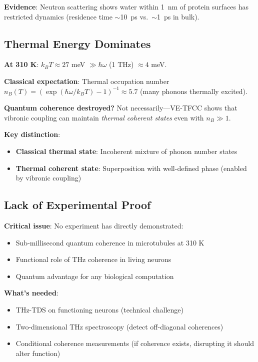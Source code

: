 \textbf{Evidence}: Neutron scattering shows water within 1~nm of protein surfaces has restricted dynamics (residence time $\sim$10~ps vs.~$\sim$1~ps in bulk).

\subsection{Thermal Energy Dominates}\label{thermal-energy-dominates}

\textbf{At 310 K}: $k_B T \approx 27$ meV $\gg \hbar \omega$ (1 THz) $\approx 4$ meV.

\textbf{Classical expectation}: Thermal occupation number $n_B(T) = (\exp(\hbar \omega / k_B T) - 1)^{-1} \approx 5.7$ (many phonons thermally excited).

\textbf{Quantum coherence destroyed?} Not necessarily---VE-TFCC shows that vibronic coupling can maintain \emph{thermal coherent states} even with $n_B \gg 1$.

\textbf{Key distinction}:
\begin{itemize}
\item \textbf{Classical thermal state}: Incoherent mixture of phonon number states
\item \textbf{Thermal coherent state}: Superposition with well-defined phase (enabled by vibronic coupling)
\end{itemize}

\subsection{Lack of Experimental Proof}\label{lack-of-experimental-proof}

\textbf{Critical issue}: No experiment has directly demonstrated:
\begin{itemize}
\item Sub-millisecond quantum coherence in microtubules at 310 K
\item Functional role of THz coherence in living neurons
\item Quantum advantage for any biological computation
\end{itemize}

\textbf{What's needed}:
\begin{itemize}
\item THz-TDS on functioning neurons (technical challenge)
\item Two-dimensional THz spectroscopy (detect off-diagonal coherences)
\item Conditional coherence measurements (if coherence exists, disrupting it should alter function)
\end{itemize}



